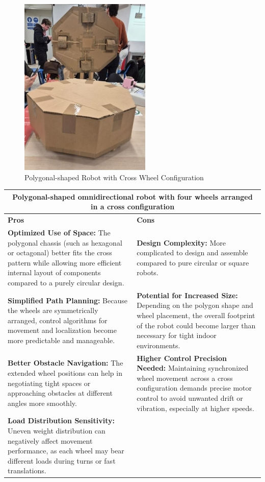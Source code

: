\begin{figure}[H]
    \centering
    \includegraphics[width=0.5\linewidth]{../ReportMovementModule/images/Aspose.Words.728084da-df58-4b9d-a372-f65cffbdb23d.004.jpeg}
    \caption{Polygonal-shaped Robot with Cross Wheel Configuration}
\end{figure}

\begin{table}[H]
\centering
\begin{tabular}{|p{}|p{}|}
\hline
\multicolumn{2}{|c|}{\textbf{Polygonal-shaped omnidirectional robot with four wheels arranged in a cross configuration}} \\
\hline
\textbf{Pros} & \textbf{Cons} \\
\hline
\textbf{Optimized Use of Space:} The polygonal chassis (such as hexagonal or octagonal) better fits the cross pattern while allowing more efficient internal layout of components compared to a purely circular design. & \textbf{Design Complexity:} More complicated to design and assemble compared to pure circular or square robots. \\
\hline
\textbf{Simplified Path Planning:} Because the wheels are symmetrically arranged, control algorithms for movement and localization become more predictable and manageable. & \textbf{Potential for Increased Size:} Depending on the polygon shape and wheel placement, the overall footprint of the robot could become larger than necessary for tight indoor environments. \\
\hline
\textbf{Better Obstacle Navigation:} The extended wheel positions can help in negotiating tight spaces or approaching obstacles at different angles more smoothly. & \textbf{Higher Control Precision Needed:} Maintaining synchronized wheel movement across a cross configuration demands precise motor control to avoid unwanted drift or vibration, especially at higher speeds. \\
\hline
\textbf{Load Distribution Sensitivity:} Uneven weight distribution can negatively affect movement performance, as each wheel may bear different loads during turns or fast translations. & \\
\hline
\end{tabular}
\end{table}

